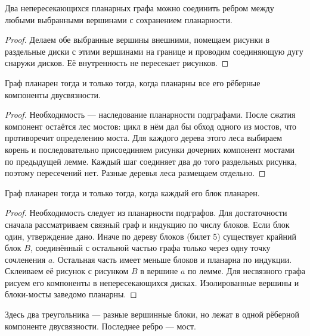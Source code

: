 \begin{lemma}
Два непересекающихся планарных графа можно соединить ребром
между любыми выбранными вершинами с сохранением планарности.
\end{lemma}
\begin{proof}
Делаем обе выбранные вершины внешними, помещаем рисунки в раздельные
диски с этими вершинами на границе и проводим соединяющую дугу
снаружи дисков. Её внутренность не пересекает рисунков.
\end{proof}
\begin{theorem}
Граф планарен тогда и только тогда, когда планарны все его
рёберные компоненты двусвязности.
\end{theorem}
\begin{proof}
Необходимость — наследование планарности подграфами.
После сжатия компонент остаётся лес мостов: цикл в нём дал бы обход
одного из мостов, что противоречит определению моста.
Для каждого дерева этого леса выбираем корень и последовательно
присоединяем рисунки дочерних компонент мостами по предыдущей лемме.
Каждый шаг соединяет два до того раздельных рисунка, поэтому пересечений нет.
Разные деревья леса размещаем отдельно.
\end{proof}
\begin{theorem}
Граф планарен тогда и только тогда, когда каждый его блок планарен.
\end{theorem}
\begin{proof}
Необходимость следует из планарности подграфов.
Для достаточности сначала рассматриваем связный граф и индукцию
по числу блоков. Если блок один, утверждение дано.
Иначе по дереву блоков (билет 5) существует крайний блок \(B\),
соединённый с остальной частью графа только через одну точку сочленения \(a\).
Остальная часть имеет меньше блоков и планарна по индукции.
Склеиваем её рисунок с рисунком \(B\) в вершине \(a\) по лемме.
Для несвязного графа рисуем его компоненты в непересекающихся дисках.
Изолированные вершины и блоки-мосты заведомо планарны.
\end{proof}
\begin{center}
\end{center}
Здесь два треугольника — разные вершинные блоки, но лежат в одной
рёберной компоненте двусвязности. Последнее ребро — мост.

\endgroup
